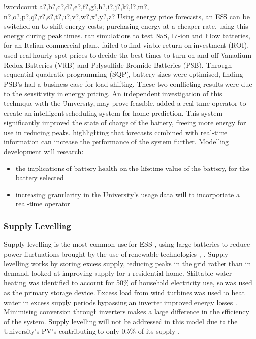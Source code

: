 \documentclass[fontsize=9.5pt]{extarticle}
\numberwithin{figure}{section} %
\providecommand{\tightlist}{%
  \setlength{\itemsep}{0pt}\setlength{\parskip}{0pt}}
\newcounter{words}
\newenvironment{counted}{%
  \setcounter{words}{0}
  \SearchList!{wordcount}{\stepcounter{words}}
    {a?,b?,c?,d?,e?,f?,g?,h?,i?,j?,k?,l?,m?,
    n?,o?,p?,q?,r?,s?,t?,u?,v?,w?,x?,y?,z?}
  \UndoBoundary{'}
  \SearchOrder{p;}}{%
  \StopSearching}
\begin{document}
\begin{counted}
Using energy price forecasts, an ESS can be switched on to shift energy
costs; purchasing energy at a cheaper rate, using this energy during
peak times. \cite{7555795} ran simulations to test NaS, Li-ion and Flow
batteries, for an Italian commercial plant, failed to find viable return
on investment (ROI)\cite{7555795}.\cite{5590194} used real hourly spot
prices to decide the best times to turn on and off Vanadium Redox
Batteries (VRB) and Polysulfide Bromide Batteries (PSB). Through
sequential quadratic programming (SQP), battery sizes were optimised,
finding PSB's had a business case for load shifting. These two
conflicting results were due to the sensitivity in energy pricing. An
independent investigation of this technique with the University, may
prove feasible. \cite{Bennett2015122} added a real-time operator to
create an intelligent scheduling system for home prediction. This system
significantly improved the state of charge of the battery, freeing more
energy for use in reducing peaks, highlighting that forecasts combined
with real-time information can increase the performance of the system
further. Modelling development will research:

\begin{itemize}
\tightlist
\item
  the implications of battery health on the lifetime value of the
  battery, for the battery selected
\item
  increasing granularity in the University's usage data will to
  incorportate a real-time operator
\end{itemize}

\subsubsection{Supply Levelling}\label{supply-levelling}

Supply levelling is the most common use for ESS \cite{iearoadmapes},
using large batteries to reduce power fluctuations brought by the use of
renewable technologies \cite{7324861}, \cite{7564619}. Supply levelling
works by storing excess supply, reducing peaks in the grid rather than
in demand. \cite{Allik20161116} looked at improving supply for a
residential home. Shiftable water heating was identified to account for
50\% of household electricity use, so was used as the primary storage
device. Excess load from wind turbines was used to heat water in excess
supply periods bypassing an inverter improved energy losses
\cite{Leadbetter2012685}. Minimising conversion through inverters makes
a large difference in the efficiency of the system. Supply levelling
will not be addressed in this model due to the University's PV's
contributing to only 0.5\% of its supply \autocite{Jbrentmeet}.


\end{counted}
\end{document}
